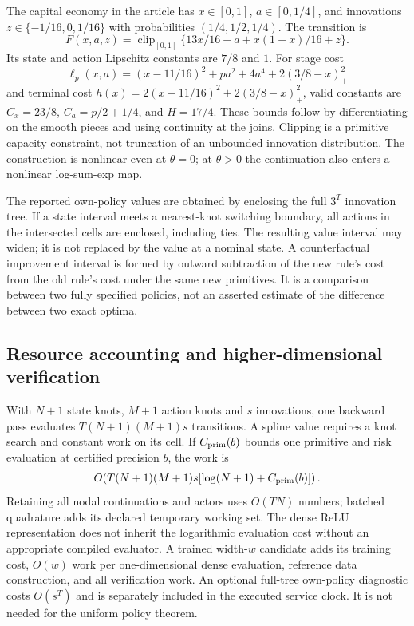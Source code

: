 The capital economy in the article has $x\in[0,1]$, $a\in[0,1/4]$, and
innovations $z\in\{-1/16,0,1/16\}$ with probabilities $(1/4,1/2,1/4)$.
The transition is
\[
 F(x,a,z)=\operatorname{clip}_{[0,1]}
       \{13x/16+a+x(1-x)/16+z\}.
\]
Its state and action Lipschitz constants are $7/8$ and $1$. For stage cost
\[
 \ell_p(x,a)=(x-11/16)^2+p a^2+4a^4+2(3/8-x)_+^2
\]
and terminal cost
$h(x)=2(x-11/16)^2+2(3/8-x)_+^2$, valid constants are
$C_x=23/8$, $C_a=p/2+1/4$, and $H=17/4$. These bounds follow by
differentiating on the smooth pieces and using continuity at the joins.
Clipping is a primitive capacity constraint, not truncation of an unbounded
innovation distribution. The construction is nonlinear even at $\theta=0$;
at $\theta>0$ the continuation also enters a nonlinear log-sum-exp map.

The reported own-policy values are obtained by enclosing the full $3^T$
innovation tree. If a state interval meets a nearest-knot switching
boundary, all actions in the intersected cells are enclosed, including ties.
The resulting value interval may widen; it is not replaced by the value at
a nominal state. A counterfactual improvement interval is formed by outward
subtraction of the new rule's cost from the old rule's cost under the same
new primitives. It is a comparison between two fully specified policies,
not an asserted estimate of the difference between two exact optima.

\subsection{Resource accounting and higher-dimensional verification}
With $N+1$ state knots, $M+1$ action knots and $s$ innovations, one backward
pass evaluates $T(N+1)(M+1)s$ transitions. A spline value requires a knot
search and constant work on its cell. If $C_{\rm prim}(b)$ bounds one
primitive and risk evaluation at certified precision $b$, the work is
\begin{equation}\label{eq:r38nonlinearcost}
 O\!\left(T(N+1)(M+1)s
       [\log(N+1)+C_{\rm prim}(b)]\right).
\end{equation}
Retaining all nodal continuations and actors uses $O(TN)$ numbers; batched
quadrature adds its declared temporary working set. The dense ReLU
representation does not inherit the logarithmic evaluation cost without an
appropriate compiled evaluator. A trained width-$w$ candidate adds its
training cost, $O(w)$ work per one-dimensional dense evaluation, reference
data construction, and all verification work. An optional full-tree
own-policy diagnostic costs $O(s^T)$ and is separately included in the
executed service clock. It is not needed for the uniform policy theorem.

